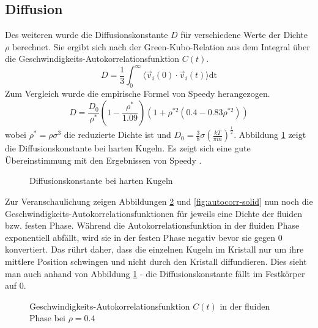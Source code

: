 \subsection{Diffusion}
Des weiteren wurde die Diffusionskonstante $D$ für verschiedene Werte der Dichte $\rho$ berechnet. Sie ergibt sich nach der Green-Kubo-Relation aus dem Integral über die Geschwindigkeits-Autokorrelationsfunktion $C(t)$.
\begin{equation}
D = \frac{1}{3}\int_0^{\infty} \langle \vec{v}_i(0)\cdot \vec{v}_i(t)\rangle \text{dt}
\end{equation}
Zum Vergleich wurde die empirische Formel von Speedy \cite{Speedy1987} herangezogen.
\begin{equation}
D = \frac{D_0}{\rho^*}\left(1-\frac{\rho^*}{1.09}\right)\left(1+\rho^{*2}\left(0.4 - 0.83\rho^{*2}\right)\right)
\end{equation}
wobei $\rho^*= \rho \sigma^3$ die reduzierte Dichte ist und $D_0 = \frac{3}{8} \sigma \left(\frac{kT}{\pi m}\right)^{\frac{1}{2}}$. Abbildung \ref{fig:diffusion} zeigt die Diffusionskonstante bei harten Kugeln. Es zeigt sich eine gute Übereinstimmung mit den Ergebnissen von Speedy \cite{Speedy1987}.
\begin{figure}[H]
 \centering
  \resizebox{0.9\textwidth}{!}{}
 \caption{Diffusionskonstante bei harten Kugeln}
 \label{fig:diffusion}
\end{figure} 
Zur Veranschaulichung zeigen Abbildungen \ref{fig:autocorr-fluid} und \ref{fig:autocorr-solid} nun noch die Geschwindigkeits-Autokorrelationsfunktionen für jeweils eine Dichte der fluiden bzw. festen Phase. Während die Autokorrelationsfunktion in der fluiden Phase exponentiell abfällt, wird sie in der festen Phase negativ bevor sie gegen 0 konvertiert. Das rührt daher, dass die einzelnen Kugeln im Kristall nur um ihre mittlere Position schwingen und nicht durch den Kristall diffundieren. Dies sieht man auch anhand von Abbildung \ref{fig:diffusion} - die Diffusionskonstante fällt im Festkörper auf 0. 

\begin{figure}[H]
 \centering
  \resizebox{0.9\textwidth}{!}{}
 \caption{Geschwindigkeits-Autokorrelationsfunktion $C(t)$ in der fluiden Phase bei $\rho = 0.4$}
 \label{fig:autocorr-fluid}
\end{figure} 

